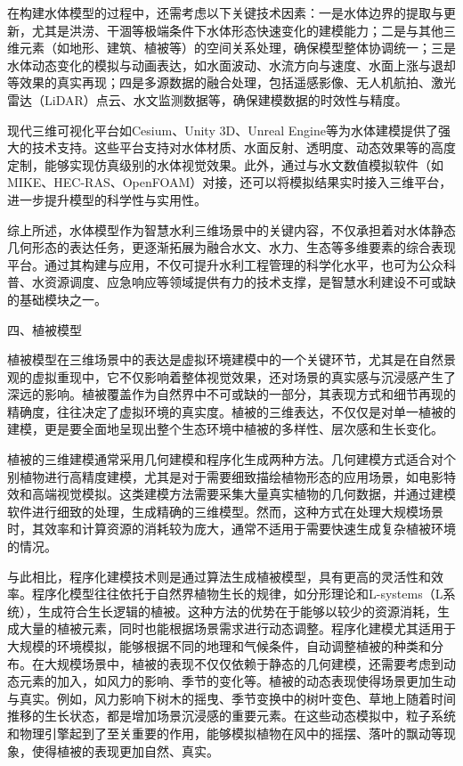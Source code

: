 在构建水体模型的过程中，还需考虑以下关键技术因素：一是水体边界的提取与更新，尤其是洪涝、干涸等极端条件下水体形态快速变化的建模能力；二是与其他三维元素（如地形、建筑、植被等）的空间关系处理，确保模型整体协调统一；三是水体动态变化的模拟与动画表达，如水面波动、水流方向与速度、水面上涨与退却等效果的真实再现；四是多源数据的融合处理，包括遥感影像、无人机航拍、激光雷达（LiDAR）点云、水文监测数据等，确保建模数据的时效性与精度。

现代三维可视化平台如Cesium、Unity 3D、Unreal Engine等为水体建模提供了强大的技术支持。这些平台支持对水体材质、水面反射、透明度、动态效果等的高度定制，能够实现仿真级别的水体视觉效果。此外，通过与水文数值模拟软件（如MIKE、HEC-RAS、OpenFOAM）对接，还可以将模拟结果实时接入三维平台，进一步提升模型的科学性与实用性。

综上所述，水体模型作为智慧水利三维场景中的关键内容，不仅承担着对水体静态几何形态的表达任务，更逐渐拓展为融合水文、水力、生态等多维要素的综合表现平台。通过其构建与应用，不仅可提升水利工程管理的科学化水平，也可为公众科普、水资源调度、应急响应等领域提供有力的技术支撑，是智慧水利建设不可或缺的基础模块之一。

四、植被模型

植被模型在三维场景中的表达是虚拟环境建模中的一个关键环节，尤其是在自然景观的虚拟重现中，它不仅影响着整体视觉效果，还对场景的真实感与沉浸感产生了深远的影响。植被覆盖作为自然界中不可或缺的一部分，其表现方式和细节再现的精确度，往往决定了虚拟环境的真实度。植被的三维表达，不仅仅是对单一植被的建模，更是要全面地呈现出整个生态环境中植被的多样性、层次感和生长变化。

植被的三维建模通常采用几何建模和程序化生成两种方法。几何建模方式适合对个别植物进行高精度建模，尤其是对于需要细致描绘植物形态的应用场景，如电影特效和高端视觉模拟。这类建模方法需要采集大量真实植物的几何数据，并通过建模软件进行细致的处理，生成精确的三维模型。然而，这种方式在处理大规模场景时，其效率和计算资源的消耗较为庞大，通常不适用于需要快速生成复杂植被环境的情况。

与此相比，程序化建模技术则是通过算法生成植被模型，具有更高的灵活性和效率。程序化模型往往依托于自然界植物生长的规律，如分形理论和L-systems（L系统），生成符合生长逻辑的植被。这种方法的优势在于能够以较少的资源消耗，生成大量的植被元素，同时也能根据场景需求进行动态调整。程序化建模尤其适用于大规模的环境模拟，能够根据不同的地理和气候条件，自动调整植被的种类和分布。在大规模场景中，植被的表现不仅仅依赖于静态的几何建模，还需要考虑到动态元素的加入，如风力的影响、季节的变化等。植被的动态表现使得场景更加生动与真实。例如，风力影响下树木的摇曳、季节变换中的树叶变色、草地上随着时间推移的生长状态，都是增加场景沉浸感的重要元素。在这些动态模拟中，粒子系统和物理引擎起到了至关重要的作用，能够模拟植物在风中的摇摆、落叶的飘动等现象，使得植被的表现更加自然、真实。

